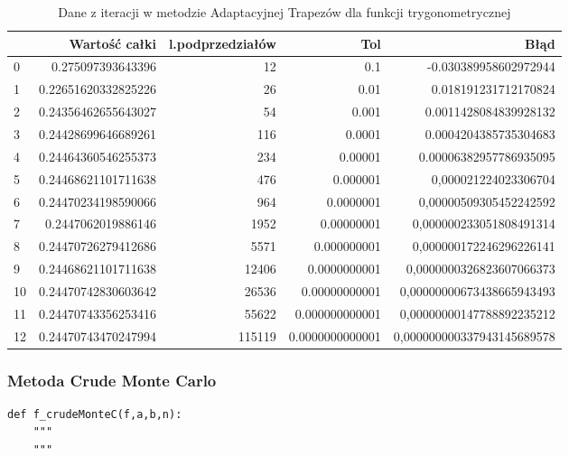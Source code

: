 \documentclass[12pt,twoside]{article}
\begin{document}
\begin{table}[H]
\centering 
\caption{Dane z iteracji w metodzie Adaptacyjnej Trapezów dla funkcji trygonometrycznej}
\label{tabela5.2}
\begin{tabular}{lrrrr}
\toprule
{} &  Wartość całki &  l.podprzedziałów &  Tol &      Błąd \\
\midrule
0 &       0.275097393643396 &  12  &   0.1 & -0.030389958602972944 \\
1 &       0.22651620332825226 &  26 &   0.01 & 0.018191231712170824 \\
2 &       0.24356462655643027 &  54  &  0.001 & 0.0011428084839928132 \\
3 &       0.24428699646689261 &  116  &  0.0001  & 0.0004204385735304683 \\
4 &       0.24464360546255373 &  234  &  0.00001  & 0.00006382957786935095 \\
5 &       0.24468621101711638 &  476  &  0.000001  & 0,000021224023306704 \\
6 &       0.24470234198590066 &  964  &  0.0000001  & 0,00000509305452242592 \\
7 &       0.2447062019886146 &  1952  &  0.00000001  & 0,000000233051808491314 \\
8 &       0.24470726279412686 & 5571  &  0.000000001  & 0,000000172246296226141 \\
9 &       0.24468621101711638 & 12406  & 0.0000000001  & 0,0000000326823607066373 \\
10 &      0.24470742830603642 & 26536  & 0.00000000001  & 0,00000000673438665943493 \\
11 &      0.24470743356253416 & 55622  &0.000000000001  & 0,00000000147788892235212 \\
12 &      0.24470743470247994 & 115119  & 0.0000000000001  & 0,000000000337943145689578 \\
\bottomrule
\end{tabular}
\end{table}

\subsubsection{Metoda Crude Monte Carlo}

\begin{lstlisting}[caption={Kod w języku python implementujący metodę Crude Monte Carlo}]
def f_crudeMonteC(f,a,b,n):
    """
    """
\end{lstlisting}
\label{Listing 11}
\end{document}
